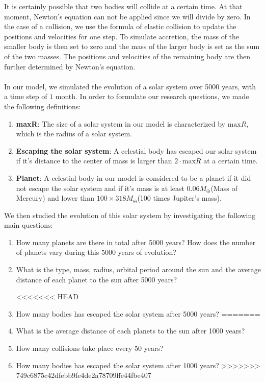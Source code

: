 It is certainly possible that two bodies will collide at a certain time. At that moment, Newton's equation can not be applied since we will divide by zero. In the case of a collision, we use the formula of elastic collision to update the positions and velocities for one step. 
To simulate accretion, the mass of the smaller body is then set to zero and the mass of the larger body is set as the sum of the two masses. The positions and velocities of the remaining body are then further determined by Newton's equation.\\
\\
In our model, we simulated the evolution of a solar system over 5000 years, with a time step of $1$ month. In order to formulate our research questions, we made the following definitions:\\
\begin{enumerate}
\item \textbf{maxR}: The size of a solar system in our model is characterized by $\text{max}R$, which is the radius of a solar system. 
\item \textbf{Escaping the solar system}: A celestial body has escaped our solar system if it's distance to the center of mass is larger than $2\cdot\text{max}R$ at a certain time.
\item \textbf{Planet}: A celestial body in our model is considered to be a planet if it did not escape the solar system and if it's mass is at least  0.06$M_{\oplus}$(Mass of Mercury) and lower than $100\times 318M_{\oplus}$(100 times Jupiter's mass).
\end{enumerate}
We then studied the evolution of this solar system by investigating the following main questions:
\begin{enumerate}
	\item  How many planets are there in total after 5000 years? How does the number of planets vary during this 5000 years of evolution?

	\item What is the type, mass, radius, orbital period around the sun and the average distance of each planet to the sun after 5000 years?

<<<<<<< HEAD
	\item How many bodies has escaped the solar system after 5000 years?
=======
	\item What is the average distance of each planets to the sun after 1000 years?
	
	\item How many collisions take place every 50 years?
	
	\item How many bodies has escaped the solar system after 1000 years?
>>>>>>> 749c6875c42dfebb9fe4de2a78709ffe44fbe407
\end{enumerate}
 